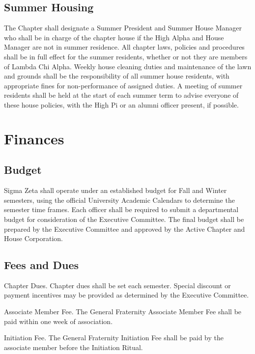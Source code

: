 \documentclass{article}
\begin{document}
\subsection{Summer Housing}

The Chapter shall designate a Summer President and Summer House Manager who
shall be in charge of the chapter house if the High Alpha and House Manager are
not in summer residence. All chapter laws, policies and procedures shall be in
full effect for the summer residents, whether or not they are members of Lambda
Chi Alpha. Weekly house cleaning duties and maintenance of the lawn and grounds
shall be the responsibility of all summer house residents, with appropriate
fines for non-performance of assigned duties. A meeting of summer residents
shall be held at the start of each summer term to advise everyone of these house
policies, with the High Pi or an alumni officer present, if possible.

\section{Finances}

\subsection{Budget}

Sigma Zeta shall operate under an established budget for Fall and Winter
semesters, using the official University Academic Calendars to determine the
semester time frames. Each officer shall be required to submit a departmental
budget for consideration of the Executive Committee. The final budget shall be
prepared by the Executive Committee and approved by the Active Chapter and House
Corporation.

\subsection{Fees and Dues}

\begin{subsubsectionList}
  \item {\titleStyle Chapter Dues.}
  Chapter dues shall be set each semester. Special discount or payment
  incentives may be provided as determined by the Executive Committee.

  \item {\titleStyle Associate Member Fee.}
  The General Fraternity Associate Member Fee shall be paid within one week of
  association.

  \item {\titleStyle Initiation Fee.}
  The General Fraternity Initiation Fee shall be paid by the associate member
  before the Initiation Ritual.
\end{subsubsectionList}
\end{document}
